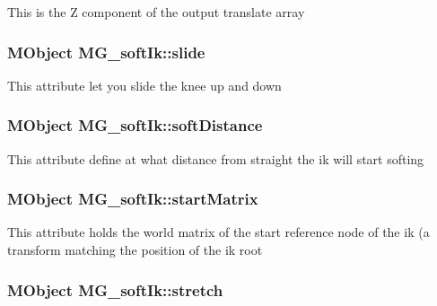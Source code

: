 This is the Z component of the output translate array \hypertarget{class_m_g__soft_ik_aeb0fdd1e018c9a49d38f64856cf0ea6c}{
\subsubsection[{slide}]{\setlength{\rightskip}{0pt plus 5cm}M\-Object M\-G\-\_\-soft\-Ik\-::slide\hspace{0.3cm}{\ttfamily [static]}}}\label{class_m_g__soft_ik_aeb0fdd1e018c9a49d38f64856cf0ea6c}
This attribute let you slide the knee up and down \hypertarget{class_m_g__soft_ik_a4ab55903fd1f7ac8b66438ad9ea07640}{
\subsubsection[{soft\-Distance}]{\setlength{\rightskip}{0pt plus 5cm}M\-Object M\-G\-\_\-soft\-Ik\-::soft\-Distance\hspace{0.3cm}{\ttfamily [static]}}}\label{class_m_g__soft_ik_a4ab55903fd1f7ac8b66438ad9ea07640}
This attribute define at what distance from straight the ik will start softing \hypertarget{class_m_g__soft_ik_aee30f7b1a9cd369af0797452171a1656}{
\subsubsection[{start\-Matrix}]{\setlength{\rightskip}{0pt plus 5cm}M\-Object M\-G\-\_\-soft\-Ik\-::start\-Matrix\hspace{0.3cm}{\ttfamily [static]}}}\label{class_m_g__soft_ik_aee30f7b1a9cd369af0797452171a1656}
This attribute holds the world matrix of the start reference node of the ik (a transform matching the position of the ik root \hypertarget{class_m_g__soft_ik_a72bd64a9986cbb29cec8953ef4199289}{
\subsubsection[{stretch}]{\setlength{\rightskip}{0pt plus 5cm}M\-Object M\-G\-\_\-soft\-Ik\-::stretch\hspace{0.3cm}{\ttfamily [static]}}}\label{class_m_g__soft_ik_a72bd64a9986cbb29cec8953ef4199289}
